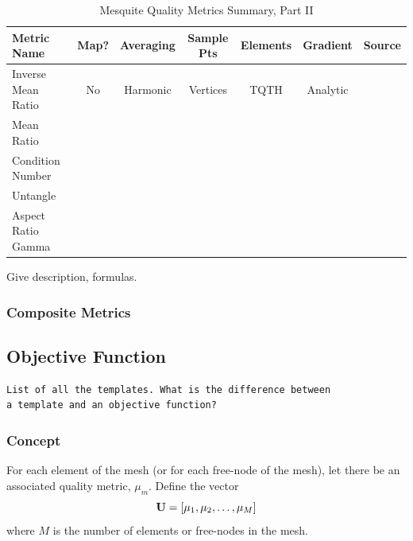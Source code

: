 \documentclass[letter]{report}
\begin{document}
\begin{table}[h]
\begin{center}
\begin{tabular}{|l|c|c|c|c|c|c|}
\hline
Metric Name & Map? & Averaging & Sample Pts & Elements & Gradient & Source \\ \hline
Inverse Mean Ratio & No & Harmonic & Vertices & TQTH & Analytic & \\ 
Mean Ratio &  &  &  &  &  \\ 
Condition Number &  &  &  &  &  \\ 
Untangle &  &  &  &  &  \\ 
Aspect Ratio Gamma &  &  &  &  &  \\ 
\hline
\end{tabular}
\caption{\label{QualityMetrics2} Mesquite Quality Metrics Summary, Part II}
\end{center}
\end{table}

 \newline
Give description, formulas. 

\subsubsection{Composite Metrics}

\subsection{Objective Function}
\begin{verbatim}
List of all the templates. What is the difference between 
a template and an objective function? 
\end{verbatim}

\subsubsection{Concept}

For each element of the mesh (or for each 
free-node of the mesh), let there be an associated quality metric, 
$\mu_m$.  Define the vector 
\begin{equation}
{\bf U} = [ \mu_1, \mu_2, \ldots, \mu_M ]
\end{equation}
where $M$ is the number of elements or free-nodes in the mesh. \newline
\end{document}
